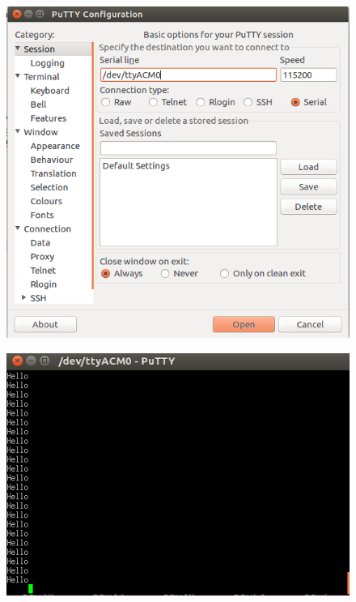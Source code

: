 \documentclass{article}
\begin{document}
\begin{figure}[H]
\begin{center}
\advance\leftskip-3cm
\advance\rightskip-3cm
\includegraphics[keepaspectratio=true,scale=0.5]{putty.png}

\label{visina8}
\end{center}\end{figure}


\begin{figure}[H]
\begin{center}
\advance\leftskip-3cm
\advance\rightskip-3cm
\includegraphics[keepaspectratio=true,scale=0.5]{resultat.png}

\label{visina8}
\end{center}\end{figure}
\end{document}
